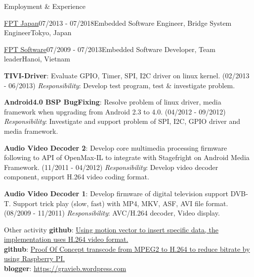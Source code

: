 \documentclass{resume}
\begin{document}
\begin{rSection}{Employment \& Experience}
\begin{rSubsection}{\href{https://www.fpt-software.jp/company-information/fpt-japan/}{\underline{FPT Japan}}}{07/2013 - 07/2018}{Embedded Software Engineer, Bridge System Engineer}{Tokyo, Japan}
    \end{rSubsection}

    \begin{rSubsection}{\href{https://www.fpt-software.com/}{\underline{FPT Software}}}{07/2009 - 07/2013}{Embedded Software Developer, Team leader}{Hanoi, Vietnam}
    \item \textbf{TIVI-Driver}: Evaluate GPIO, Timer, SPI, I2C driver on linux kernel. (02/2013 - 06/2013)
    \newline \textit{Responsibility}: Develop test program, test \& investigate problem.

    \item \textbf{Android4.0 BSP BugFixing}: Resolve problem of linux driver, media framework when upgrading from Android 2.3 to 4.0. (04/2012 - 09/2012)
    \newline \textit{Responsibility}: Investigate and support problem of SPI, I2C, GPIO driver and media framework. 

    \item \textbf{Audio Video Decoder 2}: Develop core multimedia processing firmware following to API of OpenMax-IL to integrate with Stagefright on Android Media Framework. (11/2011 - 04/2012)
    \newline \textit{Responsibility}: Develop video decoder component, support H.264 video coding format.

    \item \textbf{Audio Video Decoder 1}: Develop firmware of digital television support DVB-T. Support trick play (slow, fast) with MP4, MKV, ASF, AVI file format. (08/2009 - 11/2011)
    \newline \textit{Responsibility}: AVC/H.264 decoder, Video display.
    \end{rSubsection}


  \end{rSection}
  \begin{rSection}{Other activity}
    {\bf github}: \href{https://github.com/truongpt/video_watermarking}{Using motion vector to insert specific data, the implementation uses H.264 video format.} \\
    {\bf github}: \href{https://github.com/truongpt/omxtranscoder}{Proof Of Concept transcode from MPEG2 to H.264 to reduce bitrate by using Raspberry PI.}  \\
    {\bf blogger}: \href{https://gravieb.wordpress.com/}{https://gravieb.wordpress.com} \\

  \end{rSection}
\end{document}
